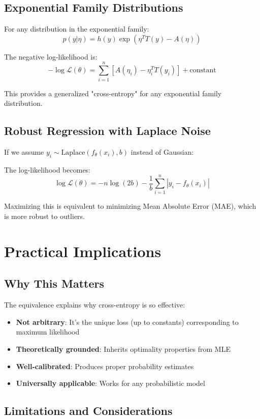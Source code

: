 \begin{notechapter}
\subsection{Exponential Family Distributions}

For any distribution in the exponential family:
\[
p(y|\eta) = h(y) \exp(\eta^T T(y) - A(\eta))
\]

The negative log-likelihood is:
\[
-\log \mathcal{L}(\theta) = \sum_{i=1}^n \left[ A(\eta_i) - \eta_i^T T(y_i) \right] + \text{constant}
\]

This provides a generalized "cross-entropy" for any exponential family distribution.

\subsection{Robust Regression with Laplace Noise}

If we assume $y_i \sim \text{Laplace}(f_\theta(x_i), b)$ instead of Gaussian:

The log-likelihood becomes:
\[
\log \mathcal{L}(\theta) = -n \log(2b) - \frac{1}{b} \sum_{i=1}^n |y_i - f_\theta(x_i)|
\]

Maximizing this is equivalent to minimizing Mean Absolute Error (MAE), which is more robust to outliers.

\section{Practical Implications}

\subsection{Why This Matters}

The equivalence explains why cross-entropy is so effective:

\begin{itemize}
    \item \textbf{Not arbitrary}: It's the unique loss (up to constants) corresponding to maximum likelihood
    \item \textbf{Theoretically grounded}: Inherits optimality properties from MLE
    \item \textbf{Well-calibrated}: Produces proper probability estimates
    \item \textbf{Universally applicable}: Works for any probabilistic model
\end{itemize}

\subsection{Limitations and Considerations}


\end{notechapter}
